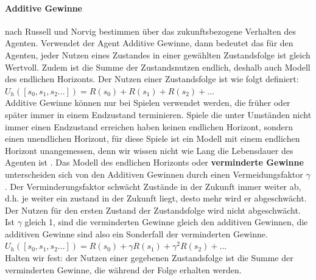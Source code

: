 \paragraph{Additive Gewinne} nach Russell und Norvig \cite[756]{Russell} bestimmen über das zukunftsbezogene Verhalten des Agenten. Verwendet der Agent Additive Gewinne, dann bedeutet das für den Agenten, jeder Nutzen eines Zustandes in einer gewählten Zustandsfolge ist gleich Wertvoll. Zudem ist die Summe der Zustandsnutzen endlich, deshalb auch Modell des endlichen Horizonts. Der Nutzen einer Zustandsfolge ist wie folgt definiert: \\

$U_h([s_0, s_1, s_2 ...]) = R(s_0) + R(s_1) + R(s_2) + ...$ \\

Additive Gewinne können nur bei Spielen verwendet werden, die früher oder später immer in einem Endzustand terminieren. Spiele die unter Umständen nicht immer einen Endzustand erreichen haben keinen endlichen Horizont, sondern einen unendlichen Horizont, für diese Spiele ist ein Modell mit einem endlichen Horizont unangemessen, denn wir wissen nicht wie Lang die Lebensdauer des Agenten ist \cite[250]{KLM96}. Das Modell des endlichen Horizonts oder \textbf{verminderte Gewinne} unterscheiden sich von den Additiven Gewinnen durch einen Vermeidungsfaktor $\gamma$. Der Verminderungsfaktor schwächt Zustände in der Zukunft immer weiter ab, d.h. je weiter ein zustand in der Zukunft liegt, desto mehr wird er abgeschwächt. Der Nutzen für den ersten Zustand der Zustandsfolge wird nicht abgeschwächt. Ist $\gamma$ gleich 1, sind die verminderten Gewinne gleich den additiven Gewinnen, die additiven Gewinne sind also ein Sonderfall der verminderten Gewinne.\\

$U_h([s_0, s_1, s_2 ...]) = R(s_0) + \gamma R(s_1) + \gamma^2 R(s_2) + ...$ \\

Halten wir fest: der Nutzen einer gegebenen Zustandsfolge ist die Summe der verminderten Gewinne, die während der Folge erhalten werden.

